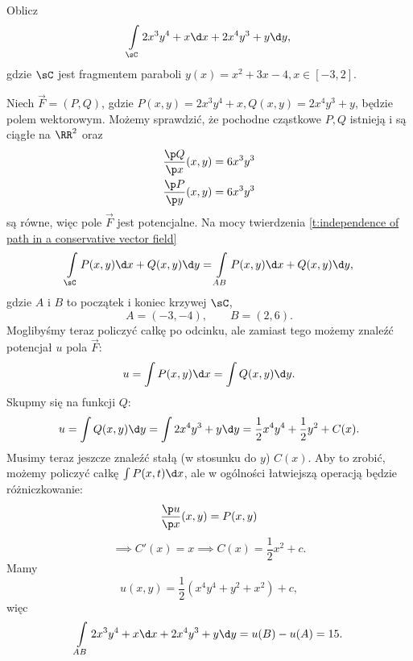 \begin{example}
    Oblicz
    \[ \int\limits_\sC 2x^3y^4 + x \d x + 2x^4y^3 + y \d y, \]
    gdzie $\sC$ jest fragmentem paraboli $y(x) = x^2 + 3x - 4, x \in [-3, 2]$.
\end{example}
\begin{solution}
    Niech $\vec{F} = (P, Q)$, gdzie $P(x, y) = 2x^3y^4 + x, Q(x, y) = 2x^4y^3 + y$, będzie polem wektorowym. Możemy sprawdzić, że pochodne cząstkowe $P, Q$ istnieją i są ciągłe na $\RR^2$ oraz
    \begin{align*}
        \frac{\p Q}{\p x}(x, y) &= 6x^3y^3 \\
        \frac{\p P}{\p y}(x, y) &= 6x^3y^3
    \end{align*}
    są równe, więc pole $\vec{F}$ jest potencjalne. Na mocy twierdzenia \ref{t:independence of path in a conservative vector field}
    \[ \int\limits_\sC P(x, y) \d x + Q(x, y) \d y = \int\limits_{AB} P(x, y) \d x + Q(x, y) \d y, \]
    gdzie $A$ i $B$ to początek i koniec krzywej $\sC$,
    \[ A = (-3, -4), \qquad B = (2, 6). \]
    Moglibyśmy teraz policzyć całkę po odcinku, ale zamiast tego możemy znaleźć potencjał $u$ pola $\vec{F}$:
    \[ u = \int P(x, y) \d x = \int Q(x, y) \d y. \]
    Skupmy się na funkcji $Q$:
    \[ u = \int Q(x, y) \d y = \int 2x^4y^3 + y \d y = \frac{1}{2}x^4y^4 + \frac{1}{2}y^2 + C(x). \]
    Musimy teraz jeszcze znaleźć stałą (w stosunku do $y$) $C(x)$. Aby to zrobić, możemy policzyć całkę $\int P(x, t) \d x$, ale w ogólności łatwiejszą operacją będzie różniczkowanie:
    \[ \frac{\p u}{\p x}(x, y) = P(x, y) \]
    \[ \implies C'(x) = x  \implies C(x) = \frac{1}{2}x^2 + c. \]
    Mamy
    \[ u(x, y) = \frac{1}{2}\left(x^4y^4 + y^2 + x^2\right) + c, \]
    więc
    \[ \int\limits_{AB} 2x^3y^4 + x \d x + 2x^4y^3 + y \d y = u(B) - u(A) = 15. \]
\end{solution}